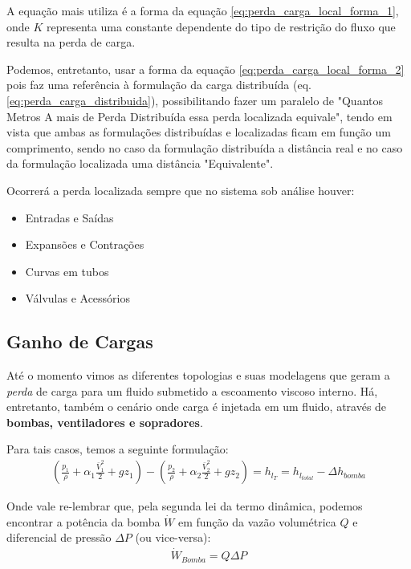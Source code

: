 \documentclass{article}
\begin{document}
$$ $$

A equação mais utiliza é a forma da equação \ref{eq:perda_carga_local_forma_1}, onde $K$ representa uma constante dependente do tipo de restrição do fluxo que resulta na perda de carga.

Podemos, entretanto, usar a forma da equação \ref{eq:perda_carga_local_forma_2} pois faz uma referência à formulação da carga distribuída (eq. \ref{eq:perda_carga_distribuida}), possibilitando fazer um paralelo de "Quantos Metros A mais de Perda Distribuída essa perda localizada equivale", tendo em
vista que ambas as formulações distribuídas e localizadas ficam em função um comprimento, sendo no caso da formulação distribuída a distância real e no caso da formulação localizada uma distância "Equivalente".

Ocorrerá a perda localizada sempre que no sistema sob análise houver:
\begin{itemize}
    \item Entradas e Saídas
    \item Expansões e Contrações
    \item Curvas em tubos
    \item Válvulas e Acessórios
\end{itemize}

\subsection{Ganho de Cargas}
Até o momento vimos as diferentes topologias e suas modelagens que geram a \emph{perda} de carga para um fluido submetido a escoamento viscoso interno. Há, entretanto,
também o cenário onde carga é injetada em um fluido, através de \textbf{bombas, ventiladores e sopradores}.

Para tais casos, temos a seguinte formulação:
\begin{align}
    \left(\frac{p_1}{\rho} + \alpha_1 \frac{\bar{V}^2_1}{2} + gz_1\right) - \left(\frac{p_2}{\rho} + \alpha_2 \frac{\bar{V}^2_2}{2} + gz_2\right) = h_{l_{T}} = h_{l_{total}} - \Delta h_{bomba}
\end{align}

Onde vale re-lembrar que, pela segunda lei da termo dinâmica, podemos encontrar a potência da bomba $\dot W$ em função da vazão volumétrica $Q$ e diferencial de pressão $\Delta P$ (ou vice-versa):
\begin{align}
    \dot W_{Bomba} = Q\Delta P
\end{align}

\newpage
\end{document}
